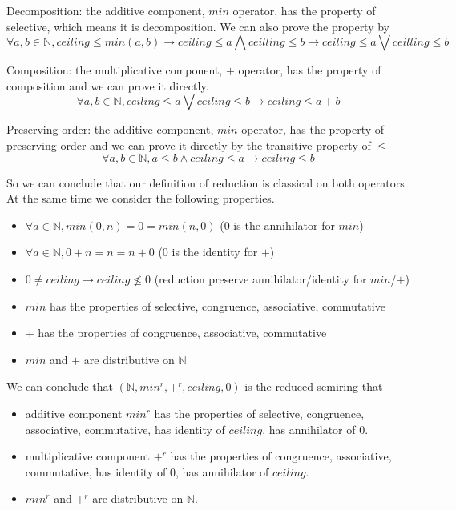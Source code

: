 \documentclass[a4paper,12pt,twoside,openright]{report}
\begin{document}
Decomposition: the additive component, $min$ operator, has the property of selective, which means it is decomposition. We can also prove the property by \[\forall a, b\in \mathbb{N}, ceiling \leq min(a,b) \rightarrow ceiling \leq a \bigwedge ceilling \leq b \rightarrow ceiling \leq a \bigvee ceilling \leq b\]

Composition: the multiplicative component, $+$ operator, has the property of composition and we can prove it directly. \[\forall a,b \in \mathbb{N}, ceiling \leq a \bigvee ceiling \leq b \rightarrow ceiling \leq a + b\]

Preserving order: the additive component, $min$ operator, has the property of preserving order and we can prove it directly by the transitive property of $\leq$
\[\forall a,b \in \mathbb{N}, a \leq b \wedge ceiling \leq a \rightarrow ceiling \leq b\]

So we can conclude that our definition of reduction is classical on both operators. At the same time we consider the following properties.
\begin{itemize}
  \item $\forall a \in \mathbb{N}, min(0,n) = 0 = min(n,0)$ (0 is the annihilator for $min$)
  \item $\forall a \in \mathbb{N}, 0 + n = n = n + 0$ (0 is the identity for $+$)
  \item $ 0 \neq ceiling \rightarrow ceiling \not\leq 0$ (reduction preserve annihilator/identity for $min$/$+$)
  \item $min$ has the properties of selective, congruence, associative, commutative
  \item $+$ has the properties of congruence, associative, commutative
  \item $min$ and $+$ are distributive on $\mathbb{N}$
\end{itemize}
We can conclude that $(\mathbb{N},min^r,+^r,ceiling,0)$ is the reduced semiring that 
\begin{itemize}
  \item additive component $min^r$ has the properties of selective, congruence, associative, commutative, has identity of $ceiling$, has annihilator of 0.
  \item multiplicative component $+^r$ has the properties of congruence, associative, commutative, has identity of 0, has annihilator of $ceiling$.
  \item $min^r$ and $+^r$ are distributive on $\mathbb{N}$.
\end{itemize}
 
\end{document}
